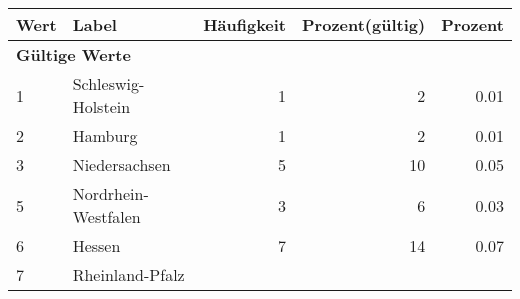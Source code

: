      \begin{longtable}{lXrrr}
     \toprule
     \textbf{Wert} & \textbf{Label} & \textbf{Häufigkeit} & \textbf{Prozent(gültig)} & \textbf{Prozent} \\
     \endhead
     \midrule
     \multicolumn{5}{l}{\textbf{Gültige Werte}}\\

     1 &
     \multicolumn{1}{X}{ Schleswig-Holstein   } &


       \num{1} &
       \num[round-mode=places,round-precision=2]{2} &
         \num[round-mode=places,round-precision=2]{0,01} \\

     2 &
     \multicolumn{1}{X}{ Hamburg   } &


       \num{1} &
       \num[round-mode=places,round-precision=2]{2} &
         \num[round-mode=places,round-precision=2]{0,01} \\

     3 &
     \multicolumn{1}{X}{ Niedersachsen   } &


       \num{5} &
       \num[round-mode=places,round-precision=2]{10} &
         \num[round-mode=places,round-precision=2]{0,05} \\

     5 &
     \multicolumn{1}{X}{ Nordrhein-Westfalen   } &


       \num{3} &
       \num[round-mode=places,round-precision=2]{6} &
         \num[round-mode=places,round-precision=2]{0,03} \\

     6 &
     \multicolumn{1}{X}{ Hessen   } &


       \num{7} &
       \num[round-mode=places,round-precision=2]{14} &
         \num[round-mode=places,round-precision=2]{0,07} \\

     7 &
     \multicolumn{1}{X}{ Rheinland-Pfalz   } &



\end{longtable}
